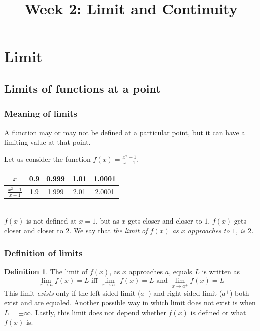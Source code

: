 \documentclass[t]{beamer}
\title{Week 2:  Limit and Continuity}
\theoremstyle{plain}
\theoremstyle{definition}
\newtheorem{dfn}{Definition}
\newcommand{\ds}{\displaystyle}
\begin{document}
\frame{\titlepage}

\setcounter{tocdepth}{2}
\frame{\tableofcontents

}


\section{Limit}

\subsection{Limits of functions at a point}
\frame
{
  \frametitle{Meaning of  limits}
  A function may or may not be defined at a particular point, but it can have a limiting value at that point.
  
  Let us consider the function $f(x)= \ds{\frac{x^2-1}{x-1}}$.\\[3mm]
  
  \begin{tabular}{|c|c|c|c|c|}\hline
  $x$ & 0.9 & 0.999 & 1.01 & 1.0001  \\ \hline
  $\ds{\frac{x^2-1}{x-1}}$ & 1.9 & 1.999 & 2.01 & 2.0001 \\ \hline
  \end{tabular}\\[3mm]
  
  $f(x)$ is not defined at $x=1$, but as $x$ gets closer and closer to $1$, $f(x)$ gets closer and closer to $2$. 
  We say that {\em the limit of $f(x)$ as $x$ approaches to $1$, is $2$.}
  }
  
\frame
{
  \frametitle{Definition of  limits}
\begin{dfn}
The limit of $f(x)$, as $x$ approaches $a$, equals $L$ is written as
\[
\lim_{x\to a} f(x) = L \textrm{ iff } \lim_{x\to a^-} f(x) = L \textrm{ and } \lim_{x\to a^+} f(x) = L
\]
This limit \textit{exists} only if the left sided limit ($a^-$) and right sided limit ($a^+$) both exist and are equaled.   Another possible way in which limit does not exist is when $L = \pm \infty$.   Lastly, this limit does not depend whether $f(x)$ is defined or what $f(x)$ is.
\end{dfn}
}
\end{document}
